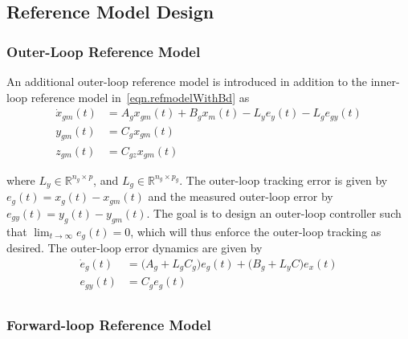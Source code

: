 \documentclass[journal]{IEEEtran}
\theoremstyle{innercustomthm}
\begin{document}
  \subsection{Reference Model Design}

  \subsubsection{Outer-Loop Reference Model}

  An additional outer-loop reference model is introduced in addition to the inner-loop reference model in\ \eqref{eqn.refmodelWithBd} as
  {%
    \small
    \begin{align}
      \dot{x}_{gm}(t) &= A_{g}x_{gm}(t) + B_{g}x_{m}(t) - L_{y}e_{y}(t) - L_{g}e_{gy}(t) \nonumber \\
      \label{eqn.refmodelouter}
      y_{gm}(t) &= C_{g}x_{gm}(t) \\
      z_{gm}(t) &= C_{gz}x_{gm}(t) \nonumber
    \end{align}
  }%

  where $L_{y}\in\mathbb{R}^{n_{g}\times p}$, and $L_{g}\in\mathbb{R}^{n_{g}\times p_{g}}$.
  The outer-loop tracking error is given by $e_{g}(t) = x_{g}(t) - x_{gm}(t)$
  and the measured outer-loop error by $e_{gy}(t) = y_{g}(t) - y_{gm}(t)$.
  The goal is to design an outer-loop controller such that $\lim_{t\rightarrow\infty}e_{g}(t)=0$, which will thus enforce the outer-loop tracking as desired.
  The outer-loop error dynamics are given by
  {%
    \small
    \begin{equation}
      \label{eqn.outerlooperrordynamics}
      \begin{split}
        \dot{e}_{g}(t) &= \bigr(A_{g} + L_{g}C_{g}\bigr)e_{g}(t) + \bigr(B_{g} + L_{y}C\bigr)e_{x}(t) \\
        e_{gy}(t) &= C_{g}e_{g}(t) \\
      \end{split}
    \end{equation}
  }%

  \subsubsection{Forward-loop Reference Model}
\end{document}
